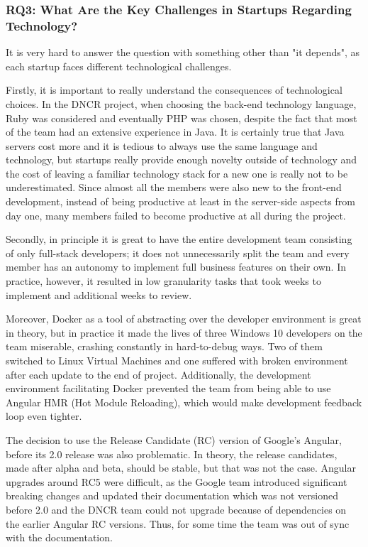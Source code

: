 \documentclass{article}
\begin{document}
\subsubsection{RQ3: What Are the Key Challenges in Startups Regarding Technology?}
It is very hard to answer the question with something other than "it depends", as each startup faces different technological challenges.

Firstly, it is important to really understand the consequences of technological choices. In the DNCR project, when choosing the back-end technology language, Ruby was considered and eventually PHP was chosen, despite the fact that most of the team had an extensive experience in Java. It is certainly true that Java servers cost more and it is tedious to always use the same language and technology, but startups really provide enough novelty outside of technology and the cost of leaving a familiar technology stack for a new one is really not to be underestimated. Since almost all the members were also new to the front-end development, instead of being productive at least in the server-side aspects from day one, many members failed to become productive at all during the project.

Secondly, in principle it is great to have the entire development team consisting of only full-stack developers; it does not unnecessarily split the team and every member has an autonomy to implement full business features on their own. In practice, however, it resulted in low granularity tasks that took weeks to implement and additional weeks to review.

Moreover, Docker as a tool of abstracting over the developer environment is great in theory, but in practice it made the lives of three Windows 10 developers on the team miserable, crashing constantly in hard-to-debug ways. Two of them switched to Linux Virtual Machines and one suffered with broken environment after each update to the end of project. Additionally, the development environment facilitating Docker prevented the team from being able to use Angular HMR (Hot Module Reloading), which would make development feedback loop even tighter.

The decision to use the Release Candidate (RC) version of Google's Angular, before its 2.0 release was also problematic. In theory, the release candidates, made after alpha and beta, should be stable, but that was not the case. Angular upgrades around RC5 were difficult, as the Google team introduced significant breaking changes and updated their documentation which was not versioned before 2.0 and the DNCR team could not upgrade because of dependencies on the earlier Angular RC versions. Thus, for some time the team was out of sync with the documentation.
\end{document}
